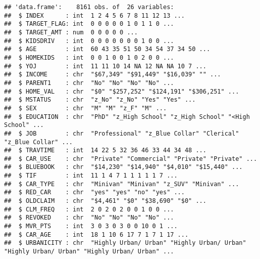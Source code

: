 \documentclass[
]{article}
\begin{document}
\begin{verbatim}
## 'data.frame':    8161 obs. of  26 variables:
##  $ INDEX      : int  1 2 4 5 6 7 8 11 12 13 ...
##  $ TARGET_FLAG: int  0 0 0 0 0 1 0 1 1 0 ...
##  $ TARGET_AMT : num  0 0 0 0 0 ...
##  $ KIDSDRIV   : int  0 0 0 0 0 0 0 1 0 0 ...
##  $ AGE        : int  60 43 35 51 50 34 54 37 34 50 ...
##  $ HOMEKIDS   : int  0 0 1 0 0 1 0 2 0 0 ...
##  $ YOJ        : int  11 11 10 14 NA 12 NA NA 10 7 ...
##  $ INCOME     : chr  "$67,349" "$91,449" "$16,039" "" ...
##  $ PARENT1    : chr  "No" "No" "No" "No" ...
##  $ HOME_VAL   : chr  "$0" "$257,252" "$124,191" "$306,251" ...
##  $ MSTATUS    : chr  "z_No" "z_No" "Yes" "Yes" ...
##  $ SEX        : chr  "M" "M" "z_F" "M" ...
##  $ EDUCATION  : chr  "PhD" "z_High School" "z_High School" "<High School" ...
##  $ JOB        : chr  "Professional" "z_Blue Collar" "Clerical" "z_Blue Collar" ...
##  $ TRAVTIME   : int  14 22 5 32 36 46 33 44 34 48 ...
##  $ CAR_USE    : chr  "Private" "Commercial" "Private" "Private" ...
##  $ BLUEBOOK   : chr  "$14,230" "$14,940" "$4,010" "$15,440" ...
##  $ TIF        : int  11 1 4 7 1 1 1 1 1 7 ...
##  $ CAR_TYPE   : chr  "Minivan" "Minivan" "z_SUV" "Minivan" ...
##  $ RED_CAR    : chr  "yes" "yes" "no" "yes" ...
##  $ OLDCLAIM   : chr  "$4,461" "$0" "$38,690" "$0" ...
##  $ CLM_FREQ   : int  2 0 2 0 2 0 0 1 0 0 ...
##  $ REVOKED    : chr  "No" "No" "No" "No" ...
##  $ MVR_PTS    : int  3 0 3 0 3 0 0 10 0 1 ...
##  $ CAR_AGE    : int  18 1 10 6 17 7 1 7 1 17 ...
##  $ URBANICITY : chr  "Highly Urban/ Urban" "Highly Urban/ Urban" "Highly Urban/ Urban" "Highly Urban/ Urban" ...
\end{verbatim}
\end{document}
